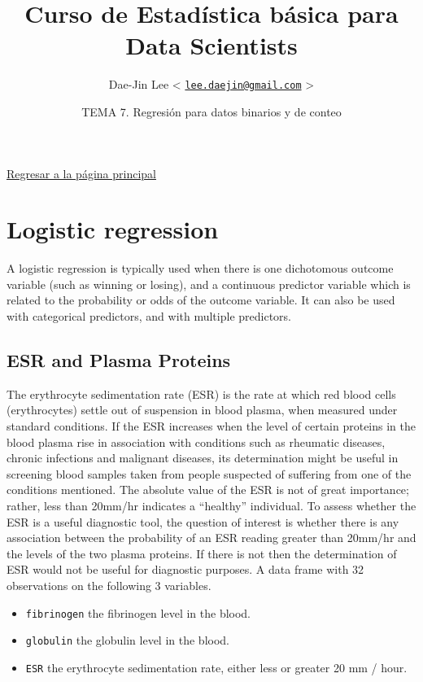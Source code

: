 \documentclass[]{article}
\title{\textbf{Curso de Estadística básica para Data Scientists}}
\author{Dae-Jin Lee \textless{}
\href{mailto:lee.daejin@gmail.com}{\nolinkurl{lee.daejin@gmail.com}}
\textgreater{}}
\date{TEMA 7. Regresión para datos binarios y de conteo}
\def\tightlist{}
\numberwithin{equation}{section}
\begin{document}
\maketitle

{
\hypersetup{linkcolor=black}
\setcounter{tocdepth}{2}
\tableofcontents
}
\newpage

\href{https://idaejin.github.io/bcam-courses/R/datahack/}{Regresar a la
página principal}

\section{Logistic regression}\label{logistic-regression}

A logistic regression is typically used when there is one dichotomous
outcome variable (such as winning or losing), and a continuous predictor
variable which is related to the probability or odds of the outcome
variable. It can also be used with categorical predictors, and with
multiple predictors.

\subsection{ESR and Plasma Proteins}\label{esr-and-plasma-proteins}

The erythrocyte sedimentation rate (ESR) is the rate at which red blood
cells (erythrocytes) settle out of suspension in blood plasma, when
measured under standard conditions. If the ESR increases when the level
of certain proteins in the blood plasma rise in association with
conditions such as rheumatic diseases, chronic infections and malignant
diseases, its determination might be useful in screening blood samples
taken from people suspected of suffering from one of the conditions
mentioned. The absolute value of the ESR is not of great importance;
rather, less than 20mm/hr indicates a ``healthy'' individual. To assess
whether the ESR is a useful diagnostic tool, the question of interest is
whether there is any association between the probability of an ESR
reading greater than 20mm/hr and the levels of the two plasma proteins.
If there is not then the determination of ESR would not be useful for
diagnostic purposes. A data frame with 32 observations on the following
3 variables.

\begin{itemize}
\tightlist
\item
  \texttt{fibrinogen} the fibrinogen level in the blood.
\item
  \texttt{globulin} the globulin level in the blood.
\item
  \texttt{ESR} the erythrocyte sedimentation rate, either less or
  greater 20 mm / hour.
\end{itemize}
\end{document}
